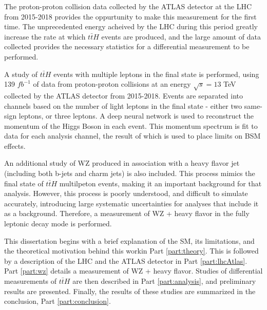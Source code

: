 The proton-proton collision data collected by the ATLAS detector at the LHC from 2015-2018 provides the oppurtunity to make this measurement for the first time. The unprecedented energy acheived by the LHC during this period greatly increase the rate at which $t\bar{t}H$ events are produced, and the large amount of data collected provides the necessary statistics for a differential measurement to be performed.

A study of $t\bar{t}H$ events with multiple leptons in the final state is performed, using 139 $fb^{-1}$ of data from proton-proton collisions at an energy $\sqrt{s} = 13$ TeV collected by the ATLAS detector from 2015-2018. Events are separated into channels based on the number of light leptons in the final state - either two same-sign leptons, or three leptons. A deep neural network is used to reconstruct the momentum of the Higgs Boson in each event. This momentum spectrum is fit to data for each analysis channel, the result of which is used to place limits on BSM effects.

An additional study of WZ produced in association with a heavy flavor jet (including both b-jets and charm jets) is also included. This process mimics the final state of $t\bar{t}H$ multilpeton events, making it an important background for that analysis. However, this process is poorly understood, and difficult to simulate accurately, introducing large systematic uncertainties for analyses that include it as a background. Therefore, a measurement of WZ + heavy flavor in the fully leptonic decay mode is performed. 

This dissertation begins with a brief explanation of the SM, its limitations, and the theoretical motivation behind this workin Part \ref{part:theory}. This is followed by a description of the LHC and the ATLAS detector in Part \ref{part:lhcAtlas}. Part \ref{part:wz} details a measurement of WZ + heavy flavor. Studies of differential measurements of $t\bar{t}H$ are then described in Part \ref{part:analysis}, and preliminary results are presented. Finally, the results of these studies are summarized in the conclusion, Part \ref{part:conclusion}.


